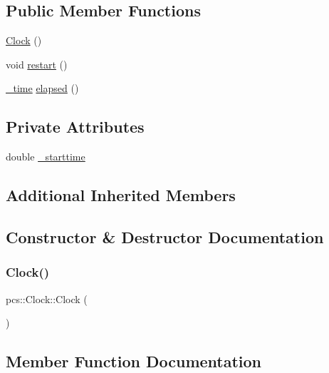 \subsection*{Public Member Functions}
\begin{DoxyCompactItemize}
\item 
\hyperlink{classpcs_1_1Clock_ad48913a9ae0601182e47e0b940287b0e}{Clock} ()
\item 
void \hyperlink{classpcs_1_1Clock_a174784ceaf9de668c92fe5a692e28af9}{restart} ()
\item 
\hyperlink{structpcs_1_1Clock_1_1__time}{\+\_\+time} \hyperlink{classpcs_1_1Clock_adfe982813138275bc67ed1ab6550195d}{elapsed} ()
\end{DoxyCompactItemize}
\subsection*{Private Attributes}
\begin{DoxyCompactItemize}
\item 
double \hyperlink{classpcs_1_1Clock_a3307066e19f91e8af0e858f3be782094}{\+\_\+starttime}
\end{DoxyCompactItemize}
\subsection*{Additional Inherited Members}


\subsection{Constructor \& Destructor Documentation}
\mbox{\label{classpcs_1_1Clock_ad48913a9ae0601182e47e0b940287b0e}} 
\subsubsection{\texorpdfstring{Clock()}{Clock()}}
{\footnotesize\ttfamily pcs\+::\+Clock\+::\+Clock (\begin{DoxyParamCaption}{ }\end{DoxyParamCaption})\hspace{0.3cm}{\ttfamily [inline]}}



\subsection{Member Function Documentation}
\mbox{\label{classpcs_1_1Clock_adfe982813138275bc67ed1ab6550195d}} 
